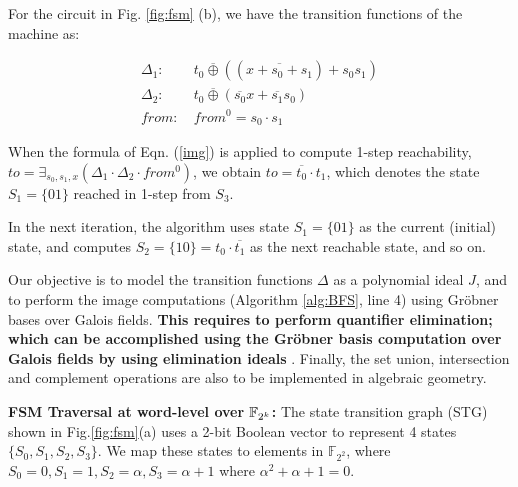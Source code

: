 \begin{Example}
For the circuit in Fig. \ref{fig:fsm} (b), we have the transition
functions of the machine as:

\begin{align*}
\Delta_1: & ~t_0 \overline{\oplus} ((\overline{x + s_0 + s_1}) + s_0 s_1)\\
\Delta_2: & ~t_0 \overline{\oplus} (\overline{s_0}x + \overline{s_1}s_0)\\
from:     & ~from^0 = s_0\cdot s_1
\end{align*}



When the formula of Eqn. (\ref{img}) is applied to compute 1-step
reachability, $to = \exists _{s_0, s_1, x} (\Delta_1 \cdot \Delta_2
\cdot from^0)$, we obtain $to = \overline{t_0}\cdot t_1$, which denotes
the state $S_1 = \{01\}$ reached in 1-step from $S_3$.

In the next iteration, the algorithm uses state $S_1 = \{01\}$ as the
current (initial) state, and computes $S_2 = \{10\} = t_0\cdot
\overline{t_1}$ as the next reachable state, and so on. 
\end{Example}


Our objective is to model the transition functions $\Delta$ as a
polynomial ideal $J$, and to perform the image computations (Algorithm
\ref{alg:BFS}, line 4) using Gr\"obner bases over Galois fields. {\bf
This requires to perform quantifier elimination; which can be
accomplished using the Gr\"obner basis computation over Galois fields
by using elimination ideals} \cite{gao:qe-gf-gb}. Finally, the set
union,  intersection and complement operations are also to be
implemented in algebraic geometry.

{\bf FSM Traversal at word-level over ${\mathbb{F}}_{2^k}$:} 
The state transition graph (STG) shown in Fig.\ref{fig:fsm}(a) uses a
2-bit Boolean vector to represent 4 states $\{S_0, S_1, S_2,
S_3\}$. We map these states to elements in $\mathbb{F}_{2^2}$, where
$S_0 = 0, S_1 = 1, S_2 = \alpha, S_3 = \alpha+1$ where $\alpha^2 +
\alpha + 1 = 0$. 

